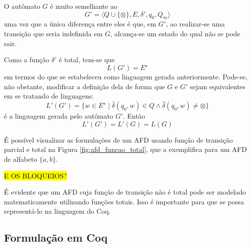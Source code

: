 O autômato $G$ é muito semelhante ao $$G' = \langle Q \cup \{ \otimes \}, E, \delta', q_0, Q_m \rangle$$ uma vez que a única diferença entre eles é que, em $G'$, ao realizar-se uma transição que seria indefinida em $G$, alcança-se um estado do qual não se pode sair.

Como a função $\delta'$ é total, tem-se que $$L(G') = E^\star$$ em termos do que se estabeleceu como linguagem gerada anteriormente. Pode-se, não obstante, modificar a definição dela de forma que $G$ e $G'$ sejam equivalentes em se tratando de linguagens: \begin{equation}L'(G') = \{ w \in E^\star \mid \hat{\delta}(q_0, w) \in Q \wedge \hat{\delta}(q_0, w) \neq \otimes \}\end{equation} é a linguagem gerada pelo autômato $G'$. Então $$L'(G') = L'(G) = L(G)$$

É possível visualizar as formulações de um AFD usando função de transição parcial e total na Figura \ref{fig:afd_funcao_total}, que a exemplifica para um AFD de alfabeto $\{ a, b \}$.


\hl{E OS BLOQUEIOS?}

É evidente que um AFD cuja função de transição não é total pode ser modelado matematicamente utilizando funções totais. Isso é importante para que se possa representá-lo na linguagem do Coq.

\subsection{Formulação em Coq}

